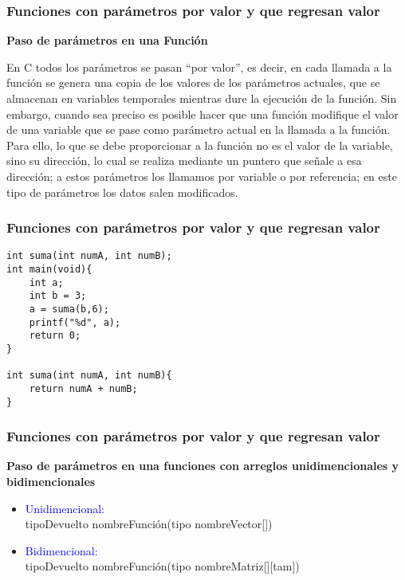 \begin{frame}
\frametitle{Funciones con parámetros por valor y que regresan valor}
\begin{center}
    \textbf{Paso de parámetros en una Función}
\end{center}
    \justify
    En C todos los parámetros se pasan “por valor”, es decir, en cada llamada a la función se genera una copia de los valores de los parámetros actuales, que se almacenan en variables temporales mientras dure la ejecución de la función. Sin embargo, cuando sea preciso es posible hacer que una función modifique el valor de una variable que se pase como parámetro actual en la llamada a la función. Para ello, lo que se debe proporcionar a la función no es el valor de la variable, sino su dirección, lo cual se realiza mediante un puntero que señale a esa dirección; a estos parámetros los llamamos por variable o por referencia; en este tipo de parámetros los datos salen modificados.

\end{frame}



\begin{frame}[fragile]
\frametitle{Funciones con parámetros por valor y que regresan valor}
\begin{lstlisting}
int suma(int numA, int numB);
int main(void){
    int a;
    int b = 3;
    a = suma(b,6);
    printf("%d", a);
    return 0;
}

int suma(int numA, int numB){
    return numA + numB;
}
\end{lstlisting}
\end{frame}



\begin{frame}[fragile]
\frametitle{Funciones con parámetros por valor y que regresan valor}
\begin{center}
    \textbf{Paso de parámetros en una funciones con arreglos unidimencionales y bidimencionales}
\end{center}
\begin{itemize}
    \item \textcolor{blue}{Unidimencional:} \\tipoDevuelto nombreFunción(tipo nombreVector[])
    \item \textcolor{blue}{Bidimencional:} \\tipoDevuelto nombreFunción(tipo nombreMatriz[][tam])
\end{itemize}
\end{frame}
